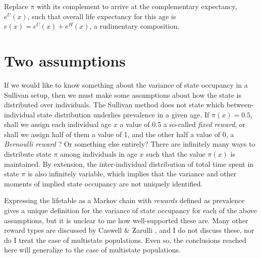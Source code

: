 \documentclass{bmcart}
\begin{document}
Replace $\pi$ with its complement to arrive at the complementary expectancy, $e^U(x)$, such that overall life expectancy for this age is $e(x) = e^U(x) + e^H(x)$, a rudimentary composition.

\section*{Two assumptions}
If we would like to know something about the variance of state occupancy in a Sullivan setup, then we must make some assumptions about how the state is distributed over individuals. The Sullivan method does not state which between-individual state distribution underlies prevalence in a given age. If $\pi(x) = 0.5$, shall we assign each individual age $x$ a value of 0.5 a so-called \emph{fixed reward}, or shall we assign half of them a value of 1, and the other half a value of 0, a \emph{Bernoulli reward} \citep{caswell2018matrix}? Or something else entirely? There are infinitely many ways to distribute state $\pi$ among individuals in age $x$ such that the value $\pi(x)$ is maintained. By extension, the inter-individual distribution of total time spent in state $\pi$ is also infinitely variable, which implies that the variance and other moments of implied state occupancy are not uniquely identified. 

Expressing the lifetable as a Markov chain with \emph{rewards} defined as prevalence gives a unique definition for the variance of state occupancy for each of the above assumptions, but it is unclear to me how well-supported these are. Many other reward types are discussed by Caswell \& Zarulli \cite{caswell2018matrix}, and I do not discuss these, nor do I treat the case of multistate populations. Even so, the conclusions reached here will generalize to the case of multistate populations.

\end{document}

